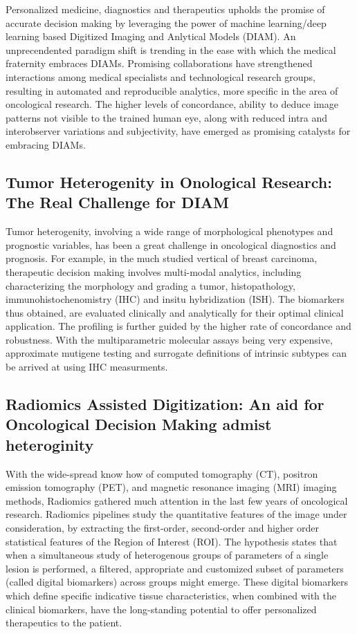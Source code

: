 \documentclass[final,1p,times,twocolumn]{elsarticle}
\begin{document}
Personalized medicine, diagnostics and therapeutics upholds the promise of accurate decision making by leveraging the power of machine learning/deep learning based Digitized Imaging and Anlytical Models (DIAM). An unprecendented paradigm shift is trending in the ease with which the medical fraternity embraces DIAMs. Promising collaborations have strengthened interactions among medical specialists and technological research groups, resulting in automated and reproducible analytics, more specific in the area of oncological research. The higher levels of concordance, ability to deduce image patterns not visible to the trained human eye, along with reduced intra and interobserver variations and subjectivity, have emerged as promising catalysts for embracing DIAMs.


\subsection{Tumor Heterogenity in Onological Research: The Real Challenge for DIAM}

Tumor heterogenity, involving a wide range of morphological phenotypes and prognostic variables, has been a great challenge in oncological diagnostics and prognosis. For example, in the much studied vertical of breast carcinoma, therapeutic decision making involves multi-modal analytics, including characterizing the morphology and grading a tumor, histopathology, immunohistochenomistry (IHC) and insitu hybridization (ISH). The biomarkers thus obtained, are evaluated clinically and analytically for their optimal clinical application. The profiling is further guided by the higher rate of concordance and robustness. With the multiparametric molecular assays being very expensive, approximate mutigene testing and surrogate definitions of intrinsic subtypes can be arrived at using IHC measurments.

\subsection{Radiomics Assisted Digitization: An aid for Oncological Decision Making admist heteroginity}

With the wide-spread know how of computed tomography (CT), positron emission tomography (PET), and magnetic resonance imaging (MRI) imaging methods, Radiomics gathered much attention in the last few years of oncological research. Radiomics pipelines study the quantitative features of the image under consideration, by extracting the first-order, second-order and higher order statistical features of the Region of Interest (ROI). The hypothesis states that when a simultaneous study of heterogenous groups of parameters of a single lesion is performed, a filtered, appropriate and customized subset of parameters (called digital biomarkers) across groups might emerge. These digital biomarkers which define specific indicative tissue characteristics, when combined with the clinical biomarkers, have the long-standing potential to offer personalized therapeutics to the patient.
\end{document}
